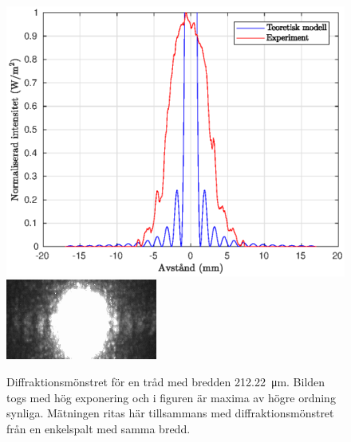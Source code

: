 \documentclass[a4paper]{article}
\begin{document}
\begin{figure}[h!]
	\centering
	\includegraphics[width=0.75\linewidth]{Data/Figurer/tradHogExpo.eps}
	\includegraphics[width=0.5\linewidth]{Data/Figurer/tradHogExpo.png}
	\caption{Diffraktionsmönstret för en tråd med bredden \SI{212.22}{\micro\m}. Bilden togs med hög exponering och i figuren är maxima av högre ordning synliga. Mätningen ritas här tillsammans med diffraktionsmönstret från en enkelspalt med samma bredd.}
	\label{fig:tradHogExpo}
\end{figure}
\end{document}
